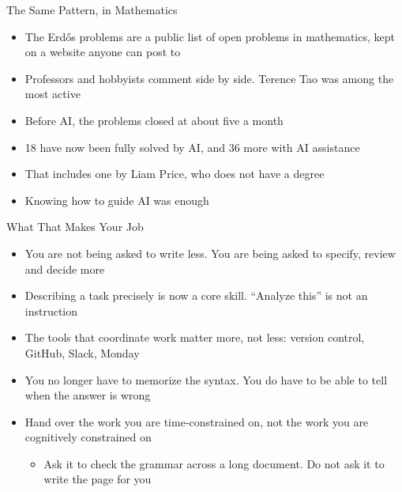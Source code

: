 \documentclass[aspectratio=169]{beamer}
\begin{document}
\begin{frame}{The Same Pattern, in Mathematics}
    \begin{itemize}\setlength{\itemsep}{6pt}
        \item The Erd\H{o}s problems are a public list of open problems in mathematics,
              kept on a website anyone can post to
        \item Professors and hobbyists comment side by side. Terence Tao was among the
              most active
        \item Before AI, the problems closed at about five a month
        \item 18 have now been fully solved by AI, and 36 more with AI assistance
        \item That includes one by Liam Price, who does not have a degree
        \item Knowing how to guide AI was enough
    \end{itemize}
\end{frame}

\begin{frame}{What That Makes Your Job}
    \begin{itemize}\setlength{\itemsep}{7pt}
        \item You are not being asked to write less. You are being asked to specify, review
              and decide more
        \item Describing a task precisely is now a core skill. ``Analyze this'' is not an
              instruction
        \item The tools that coordinate work matter more, not less: version control,
              GitHub, Slack, Monday
        \item You no longer have to memorize the syntax. You do have to be able to tell when
              the answer is wrong
        \item Hand over the work you are time-constrained on, not the work you are
              cognitively constrained on
        \vspace{2pt}
        \begin{itemize}
            \item Ask it to check the grammar across a long document. Do not ask it to write
                  the page for you
        \end{itemize}
    \end{itemize}
\end{frame}
\end{document}
